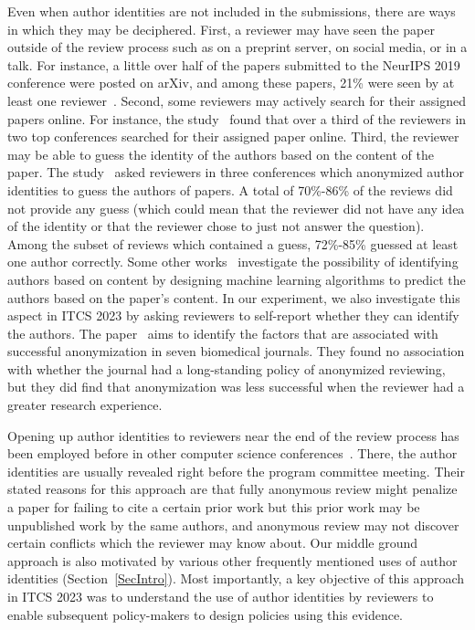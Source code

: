 \documentclass{article}
\newcommand{\rev}[1]{{\color{black}#1}}
\begin{document}
Even when author identities are not included in the submissions, there are ways in which they may be deciphered. First, a reviewer may have seen the paper outside of the review process such as on a preprint server, on social media, or in a talk. For instance, a little over half of the papers submitted to the NeurIPS 2019 conference were posted on arXiv, and among these papers, 21\% were seen by at least one reviewer~\cite{beygelzimer2019neurips}. Second, some reviewers may actively search for their assigned papers online. For instance, the study~\cite{rastogi2022arxiv} found that over a third of the reviewers in two top conferences searched for their assigned paper online. Third, the reviewer may be able to guess the identity of the authors based on the content of the paper. The study~\cite{goues2018effectiveness} asked reviewers in three conferences which anonymized author identities to guess the authors of papers.  
A total of 70\%-86\% of the reviews did not provide any guess (which could mean that the reviewer did not have any idea of the identity or that the reviewer chose to just not answer the question). Among the subset of reviews which contained a guess, 72\%-85\% guessed at least one author correctly. Some other works~\cite{shawndra03identification,caragea2019myth,matsubara2020citations} investigate the possibility of identifying authors based on content by designing machine learning algorithms to predict the authors based on the paper's content. In our experiment, we also investigate this aspect in ITCS 2023 by asking reviewers to self-report whether they can identify the authors. \rev{The paper~\cite{cho1998masking} aims to identify the factors that are associated with successful anonymization in seven biomedical journals. They found no association with whether the journal had a long-standing policy of anonymized reviewing, but they did find that anonymization was less successful when the reviewer had a greater research experience. }

Opening up author identities to reviewers near the end of the review process has been employed before in other computer science conferences~\cite{Hicks_2012}. There, the author identities are usually revealed right before the program committee meeting. Their stated reasons for this approach are that fully anonymous review might penalize a paper for failing to cite a certain prior work but this prior work may be unpublished work by the same authors, and anonymous review may not discover certain conflicts which the reviewer may know about. Our middle ground approach is also motivated by various other frequently mentioned uses of author identities (Section~\ref{SecIntro}). Most importantly, a key objective of this approach in ITCS 2023 was to understand the use of author identities by reviewers to enable subsequent policy-makers to design policies using this evidence. 
\end{document}
